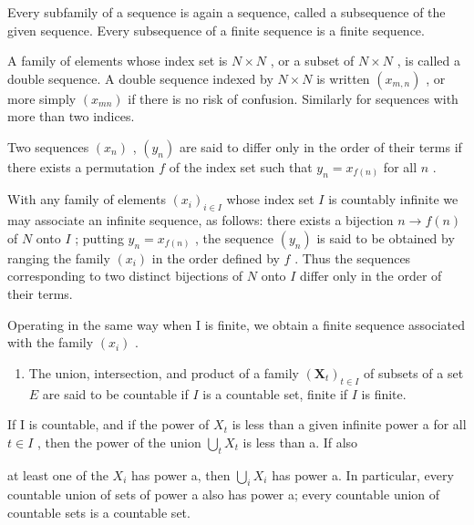 Every subfamily of a sequence is again a sequence, called a subsequence of the given sequence. Every subsequence of a finite sequence is a finite sequence.

A family of elements whose index set is \(N \times N\) , or a subset of \(N \times N\) , is called a double sequence. A double sequence indexed by \(N \times N\) is written \((x_{m,n})\) , or more simply \((x_{mn})\) if there is no risk of confusion. Similarly for sequences with more than two indices.

Two sequences \((x_{n})\) , \((y_{n})\) are said to differ only in the order of their terms if there exists a permutation \(f\) of the index set such that \(y_{n} = x_{f(n)}\) for all \(n\) .

With any family of elements \((x_{i})_{i\in I}\) whose index set \(I\) is countably infinite we may associate an infinite sequence, as follows: there exists a bijection \(n\to f(n)\) of \(N\) onto \(I\) ; putting \(y_{n} = x_{f(n)}\) , the sequence \((y_{n})\) is said to be obtained by ranging the family \((x_{i})\) in the order defined by \(f\) . Thus the sequences corresponding to two distinct bijections of \(N\) onto \(I\) differ only in the order of their terms.

Operating in the same way when I is finite, we obtain a finite sequence associated with the family \((x_{i})\) .

\begin{enumerate}
\def\labelenumi{\arabic{enumi}.}
\setcounter{enumi}{8}
\tightlist
\item
  The union, intersection, and product of a family \((\mathbf{X}_t)_{t\in I}\) of subsets of a set \(E\) are said to be countable if \(I\) is a countable set, finite if \(I\) is finite.
\end{enumerate}

If I is countable, and if the power of \(X_{t}\) is less than a given infinite power a for all \(t \in I\) , then the power of the union \(\bigcup_{t} X_{t}\) is less than a. If also

at least one of the \(X_{i}\) has power a, then \(\bigcup_{i}X_{i}\) has power a. In particular, every countable union of sets of power a also has power a; every countable union of countable sets is a countable set.

